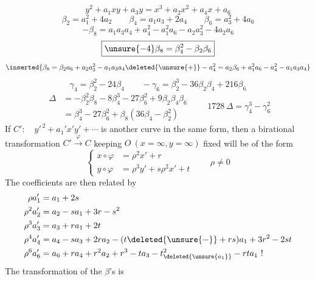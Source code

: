 \[
\boxed{y^2+a_1xy+a_3y=x^3+a_2x^2+a_4x+a_6}
\]
\[
\beta_2=a_1^2+4a_2\qquad \beta_4=a_1a_3+2a_4\qquad \beta_6=a_3^2+4a_6
\]
\[
-\beta_8=a_1a_3a_4+a_4^2-a_1^2a_6-a_2a_3^2-4a_2a_6
\]
\[
\boxed{\unsure{-4}\beta_8=\beta_4^2-\beta_2\beta_6}
\]
\[
\inserted{\beta_8=\beta_2a_6+a_2a_3^2-a_1a_3a_4\deleted{\unsure{+}}-a_4^2
=a_2\beta_6+a_1^2a_6-a_4^2-a_1a_3a_4}
\]
\[
\gamma_4=\beta_2^2-24\beta_4\qquad -\gamma_6=\beta_2^3-36\beta_2\beta_4+216\beta_6
\]
\[
\begin{aligned}
\Delta&=-\beta_2^2\beta_8-8\beta_4^3-27\beta_6^2+9\beta_2\beta_4\beta_6\\
&=\beta_4^3-27\beta_6^2+\beta_8(36\beta_4-\beta_2^2)
\end{aligned}
\qquad\boxed{1728\,\Delta=\gamma_4^3-\gamma_6^2}
\]
If $C':\quad y'^{\,2}+a_1'x'y'+\cdots$ is another curve in the same form, then a birational transformation $C'\xrightarrow{\varphi}C$ keeping $O\ (x=\infty,y=\infty)$ fixed will be of the form
\[
\left\{\begin{aligned}
x\circ\varphi&=\rho^2x'+r\\
y\circ\varphi&=\rho^3y'+s\rho^2x'+t
\end{aligned}\right.\qquad \rho\ne0
\]
The coefficients are then related by
\[
\begin{aligned}
\rho a_1'&=a_1+2s\\
\rho^2a_2'&=a_2-sa_1+3r-s^2\\
\rho^3a_3'&=a_3+ra_1+2t\\
\rho^4a_4'&=a_4-sa_3+2ra_2-(t\deleted{\unsure{-}}+rs)a_1+3r^2-2st\\
\rho^6a_6'&=a_6+ra_4+r^2a_2+r^3-ta_3-t_{\deleted{\unsure{a_1}}}^2-rta_1\ !
\end{aligned}
\]
The transformation of the $\beta$'s is
